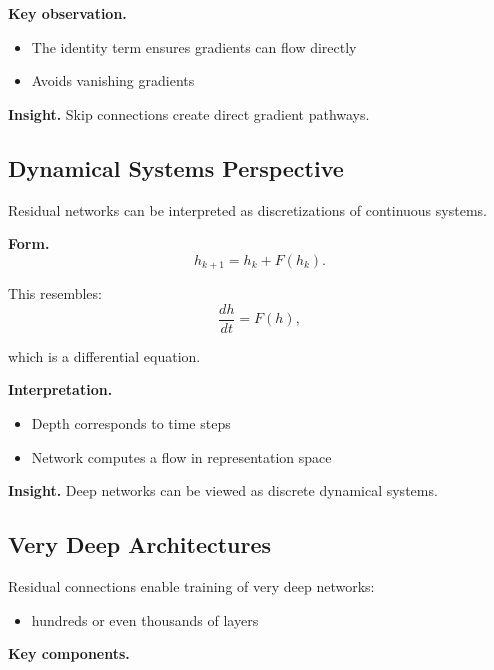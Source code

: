 \noindent
\textbf{Key observation.}

\begin{itemize}
    \item The identity term ensures gradients can flow directly
    \item Avoids vanishing gradients
\end{itemize}

\medskip

\noindent
\textbf{Insight.}  
Skip connections create direct gradient pathways.

\subsection{Dynamical Systems Perspective}

Residual networks can be interpreted as discretizations of continuous systems.

\medskip

\noindent
\textbf{Form.}
\[
h_{k+1} = h_k + F(h_k).
\]

\medskip

\noindent
This resembles:
\[
\frac{dh}{dt} = F(h),
\]

which is a differential equation.

\medskip

\noindent
\textbf{Interpretation.}

\begin{itemize}
    \item Depth corresponds to time steps
    \item Network computes a flow in representation space
\end{itemize}

\medskip

\noindent
\textbf{Insight.}  
Deep networks can be viewed as discrete dynamical systems.

\subsection{Very Deep Architectures}

Residual connections enable training of very deep networks:

\begin{itemize}
    \item hundreds or even thousands of layers
\end{itemize}

\medskip

\noindent
\textbf{Key components.}

